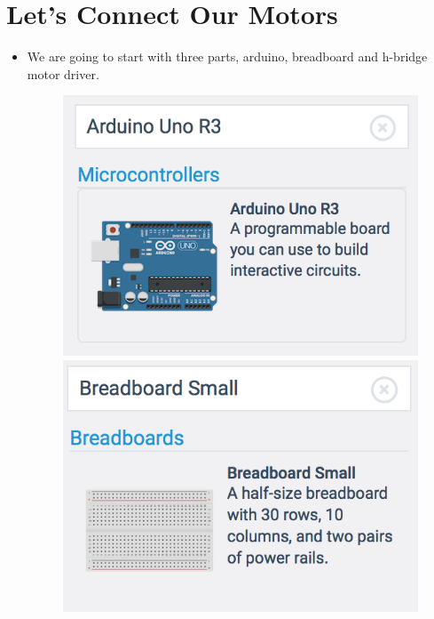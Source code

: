 \documentclass[12pt]{article}
\begin{document}
\section *{Let's Connect Our Motors}
	\begin{itemize}
		\item We are going to start with three parts, arduino, breadboard and h-bridge motor driver. 
		\begin{center}
    		\begin{figure}[h!]
				\begin{minipage}[t]{0.48\textwidth}
					\includegraphics[scale = 0.71]{./Images/arduino}
				\end{minipage}
				\hspace*{\fill} %
				\begin{minipage}[t]{0.48\textwidth}
					\includegraphics[scale = 0.75]{./Images/breadboard}

\end{minipage}
\end{figure}
\end{center}
\end{itemize}
\end{document}
